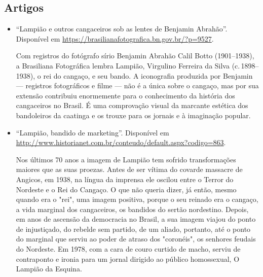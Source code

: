 \documentclass[11pt]{extarticle}
\begin{document}
\subsection{Artigos}

\begin{itemize}
\item ``Lampião e outros cangaceiros sob as lentes de Benjamin Abrahão''. Disponível em \url{https://brasilianafotografica.bn.gov.br/?p=9527}.

Com registros do fotógrafo sírio Benjamin Abrahão Calil Botto (1901--1938), a Brasiliana Fotográfica lembra Lampião, 
Virgulino Ferreira da Silva (c.\,1898--1938), o rei do cangaço, e seu bando. A iconografia produzida por Benjamin --- registros fotográficos e filme --- não é a única sobre o cangaço, mas por sua extensão contribuiu enormemente para o conhecimento da história dos cangaceiros no Brasil. É uma comprovação visual da marcante estética dos bandoleiros da caatinga e os trouxe para os jornais e à imaginação popular.

\item ``Lampião, bandido de marketing''. Disponível em \url{http://www.historianet.com.br/conteudo/default.aspx?codigo=863}.

Nos últimos 70 anos a imagem de Lampião tem sofrido transformações maiores que as suas proezas. Antes de ser vítima do covarde massacre de Angicos, em 1938, na língua da imprensa ele oscilou entre o Terror do Nordeste e o Rei do Cangaço. O que não queria dizer, já então, mesmo quando era o "rei", uma imagem positiva, porque o seu reinado era o cangaço, a vida marginal dos cangaceiros, os bandidos do sertão nordestino. Depois, em anos de ascensão da democracia no Brasil, a sua imagem viajou do ponto de injustiçado, do rebelde sem partido, de um aliado, portanto, até o ponto do marginal que serviu ao poder de atraso dos "coronéis", os senhores feudais do Nordeste. Em 1978, com a cara de couro curtido de macho, serviu de contraponto e ironia para um jornal dirigido ao público homossexual, O Lampião da Esquina.

\end{itemize}
\end{document}

